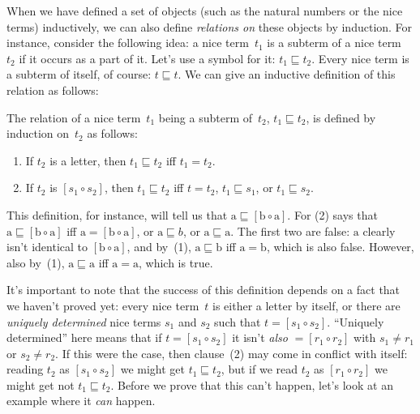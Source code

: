 \documentclass[../../../include/open-logic-section]{subfiles}
\begin{document}


When we have defined a set of objects (such as the natural numbers or
the nice terms) inductively, we can also define \emph{relations on}
these objects by induction.  For instance, consider the following
idea: a nice term~$t_1$ is a subterm of a nice term~$t_2$ if it occurs as
a part of it.  Let's use a symbol for it: $t_1 \sqsubseteq t_2$. Every
nice term is a subterm of itself, of course: $t \sqsubseteq t$. We can
give an inductive definition of this relation as follows:

\begin{defn}
  The relation of a nice term~$t_1$ being a subterm of~$t_2$, $t_1
  \sqsubseteq t_2$, is defined by induction on~$t_2$ as follows:
  \begin{enumerate}
  \item If $t_2$ is a letter, then $t_1 \sqsubseteq t_2$ iff $t_1 = t_2$.
  \item If $t_2$ is $[s_1 \circ s_2]$, then $t_1 \sqsubseteq t_2$ iff $t =
    t_2$, $t_1 \sqsubseteq s_1$, or $t_1 \sqsubseteq s_2$.
  \end{enumerate}
\end{defn}

This definition, for instance, will tell us that $\mathrm{a}
\sqsubseteq [\mathrm{b} \circ \mathrm{a}]$. For (2) says that
$\mathrm{a} \sqsubseteq [\mathrm{b} \circ \mathrm{a}]$ iff $\mathrm{a}
= [\mathrm{b} \circ \mathrm{a}]$, or $\mathrm{a} \sqsubseteq b$, or
$\mathrm{a} \sqsubseteq \mathrm{a}$. The first two are false:
$\mathrm{a}$ clearly isn't identical to $[\mathrm{b} \circ
  \mathrm{a}]$, and by~(1), $\mathrm{a} \sqsubseteq \mathrm{b}$ iff
$\mathrm{a} = \mathrm{b}$, which is also false. However, also by~(1),
$\mathrm{a} \sqsubseteq \mathrm{a}$ iff $\mathrm{a} = \mathrm{a}$,
which is true.

It's important to note that the success of this definition depends on
a fact that we haven't proved yet: every nice term~$t$ is either a
letter by itself, or there are \emph{uniquely determined} nice terms
$s_1$ and $s_2$ such that $t = [s_1 \circ s_2]$.  ``Uniquely
determined'' here means that if $t = [s_1 \circ s_2]$ it isn't
\emph{also} $= [r_1 \circ r_2]$ with $s_1 \neq r_1$ or $s_2 \neq r_2$.
If this were the case, then clause~(2) may come in conflict with
itself: reading $t_2$ as $[s_1 \circ s_2]$ we might get $t_1
\sqsubseteq t_2$, but if we read $t_2$ as $[r_1 \circ r_2]$ we might
get not $t_1 \sqsubseteq t_2$.  Before we prove that this can't
happen, let's look at an example where it \emph{can} happen.
\end{document}

